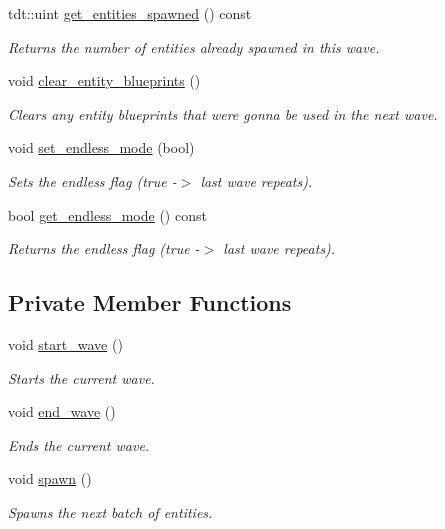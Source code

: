 \begin{DoxyCompactItemize}
tdt\+::uint \hyperlink{class_wave_system_a5ba8e7f51331db297c3fb8ff317021eb}{get\+\_\+entities\+\_\+spawned} () const 
\begin{DoxyCompactList}\small\item\em Returns the number of entities already spawned in this wave. \end{DoxyCompactList}\item 
void \hyperlink{class_wave_system_a64ee44c82e52e02ac332608a1f54febc}{clear\+\_\+entity\+\_\+blueprints} ()
\begin{DoxyCompactList}\small\item\em Clears any entity blueprints that were gonna be used in the next wave. \end{DoxyCompactList}\item 
void \hyperlink{class_wave_system_a6068d7406fbaf4a2aa18e1b5e13a79a7}{set\+\_\+endless\+\_\+mode} (bool)
\begin{DoxyCompactList}\small\item\em Sets the endless flag (true -\/$>$ last wave repeats). \end{DoxyCompactList}\item 
bool \hyperlink{class_wave_system_ab12aad00426af3a0b67d6ff2c6387b47}{get\+\_\+endless\+\_\+mode} () const 
\begin{DoxyCompactList}\small\item\em Returns the endless flag (true -\/$>$ last wave repeats). \end{DoxyCompactList}\end{DoxyCompactItemize}
\subsection*{Private Member Functions}
\begin{DoxyCompactItemize}
\item 
void \hyperlink{class_wave_system_afa2eb918f42c322630c5ed1f0c3d3355}{start\+\_\+wave} ()
\begin{DoxyCompactList}\small\item\em Starts the current wave. \end{DoxyCompactList}\item 
void \hyperlink{class_wave_system_a1f600d9b4fb4646bef2aa2dccc8809ac}{end\+\_\+wave} ()
\begin{DoxyCompactList}\small\item\em Ends the current wave. \end{DoxyCompactList}\item 
void \hyperlink{class_wave_system_af0a6a8cbcc4663d5ada8b6dd7d77b972}{spawn} ()
\begin{DoxyCompactList}\small\item\em Spawns the next batch of entities. \end{DoxyCompactList}\end{DoxyCompactItemize}
